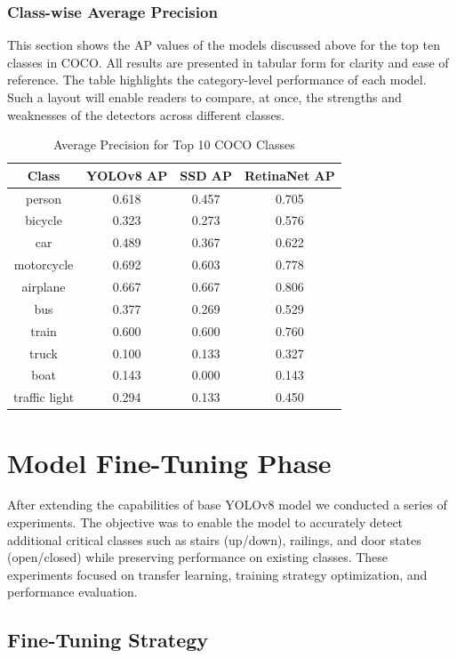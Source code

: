 \documentclass{FastFyp}
\begin{document}
\subsubsection{Class-wise Average Precision}
This section shows the AP values of the models discussed above for the top ten classes in COCO. All results are presented in tabular form for clarity and ease of reference. The table highlights the category-level performance of each model. Such a layout will enable readers to compare, at once, the strengths and weaknesses of the detectors across different classes.
\begin{table}[h!]
\centering
\caption{Average Precision for Top 10 COCO Classes}
\begin{tabular}{|c|c|c|c|}
\hline
\textbf{Class} & \textbf{YOLOv8 AP} & \textbf{SSD AP} & \textbf{RetinaNet AP} \\
\hline
person & 0.618 & 0.457 & 0.705 \\
\hline
bicycle & 0.323 & 0.273 & 0.576 \\
\hline
car & 0.489 & 0.367 & 0.622 \\
\hline
motorcycle & 0.692 & 0.603 & 0.778 \\
\hline
airplane & 0.667 & 0.667 & 0.806 \\
\hline
bus & 0.377 & 0.269 & 0.529 \\
\hline
train & 0.600 & 0.600 & 0.760 \\
\hline
truck & 0.100 & 0.133 & 0.327 \\
\hline
boat & 0.143 & 0.000 & 0.143 \\
\hline
traffic light & 0.294 & 0.133 & 0.450 \\
\hline
\end{tabular}
\end{table}

\section{Model Fine-Tuning Phase}

After extending the capabilities of base YOLOv8 model we conducted a series of experiments. The objective was to enable the model to accurately detect additional critical classes such as stairs (up/down), railings, and door states (open/closed) while preserving performance on existing classes.
These experiments focused on transfer learning, training strategy optimization, and performance evaluation.

\subsection{Fine-Tuning Strategy}
\end{document}
